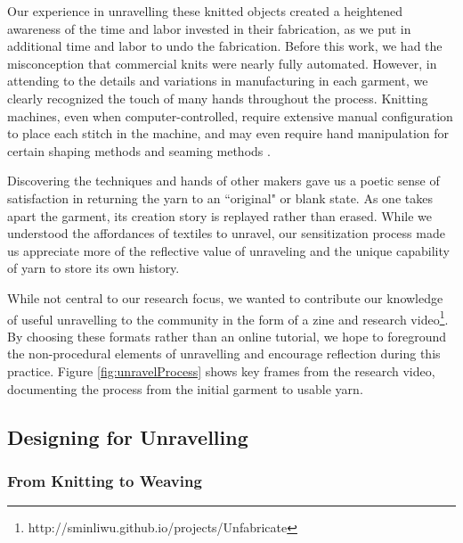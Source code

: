 
Our experience in unravelling these knitted objects created a heightened awareness of the time and labor invested in their fabrication, as we put in additional time and labor to undo the fabrication. Before this work, we had the misconception that commercial knits were nearly fully automated. However, in attending to the details and variations in manufacturing in each garment, we clearly recognized the touch of many hands throughout the process. Knitting machines, even when computer-controlled, require extensive manual configuration to place each stitch in the machine, and may even require hand manipulation for certain shaping methods and seaming methods \cite{rowan_machineknitting}.

Discovering the techniques and hands of other makers gave us a poetic sense of satisfaction in returning the yarn to an ``original" or blank state. As one takes apart the garment, its creation story is replayed rather than erased. While we understood the affordances of textiles to unravel, our sensitization process made us appreciate more of the reflective value of unraveling and the unique capability of yarn to store its own history. 

While not central to our research focus, we wanted to contribute our knowledge of useful unravelling to the community in the form of a zine and research video\footnote{http://sminliwu.github.io/projects/Unfabricate}. By choosing these formats rather than an online tutorial, we hope to foreground the non-procedural elements of unravelling and encourage reflection during this practice. Figure \ref{fig:unravelProcess} shows key frames from the research video, documenting the process from the initial garment to usable yarn.  

\subsection{Designing for Unravelling}

\subsubsection{From Knitting to Weaving}

